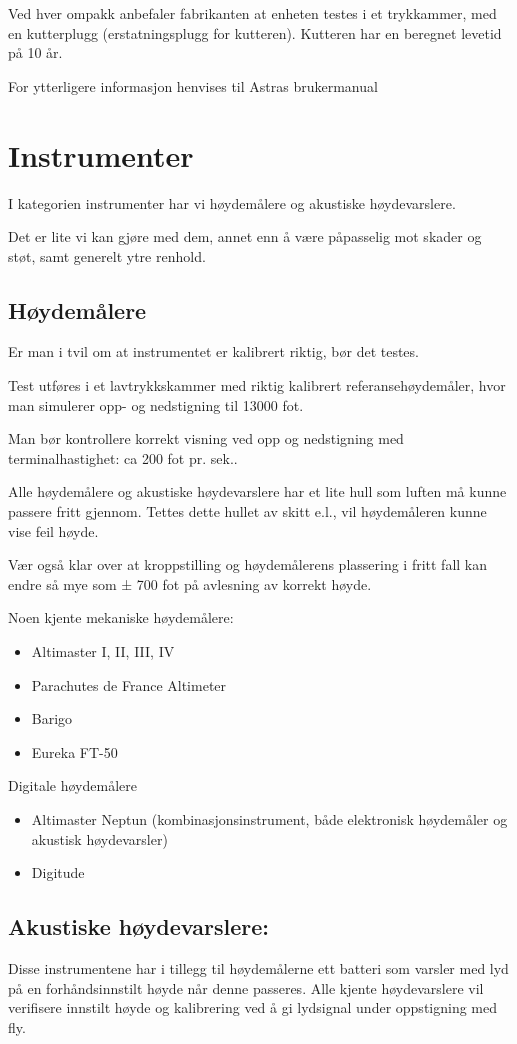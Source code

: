 Ved hver ompakk anbefaler fabrikanten at enheten testes i et trykkammer, med en kutterplugg (erstatningsplugg for kutteren). Kutteren har en beregnet levetid på 10 år.

For ytterligere informasjon henvises til Astras brukermanual

\section{Instrumenter}
I kategorien instrumenter har vi høydemålere og akustiske høydevarslere.

Det er lite vi kan gjøre med dem, annet enn å være påpasselig mot skader og støt, samt generelt ytre renhold.

\subsection{Høydemålere}
Er man i tvil om at instrumentet er kalibrert riktig, bør det testes.

Test utføres i et lavtrykkskammer med riktig kalibrert referansehøydemåler, hvor man simulerer opp- og nedstigning til 13000 fot.

Man bør kontrollere korrekt visning ved opp og nedstigning med terminalhastighet: ca 200 fot pr. sek..

Alle høydemålere og akustiske høydevarslere har et lite hull som luften må kunne passere fritt gjennom. Tettes dette hullet av skitt e.l., vil høydemåleren kunne vise feil høyde.

Vær også klar over at kroppstilling og høydemålerens plassering i fritt fall kan endre så mye som ± 700 fot på avlesning av korrekt høyde.

Noen kjente mekaniske høydemålere:
\begin{itemize}
\item Altimaster I, II, III, IV
\item Parachutes de France Altimeter
\item Barigo
\item Eureka FT-50
\end{itemize}

Digitale høydemålere
\begin{itemize}
\item Altimaster Neptun (kombinasjonsinstrument, både elektronisk høydemåler og akustisk høydevarsler)
\item Digitude
\end{itemize}

\subsection{Akustiske høydevarslere:}
Disse instrumentene har i tillegg til høydemålerne ett batteri som varsler med lyd på en forhåndsinnstilt høyde når denne passeres. Alle kjente høydevarslere vil verifisere innstilt høyde og kalibrering ved å gi lydsignal under oppstigning med fly.

